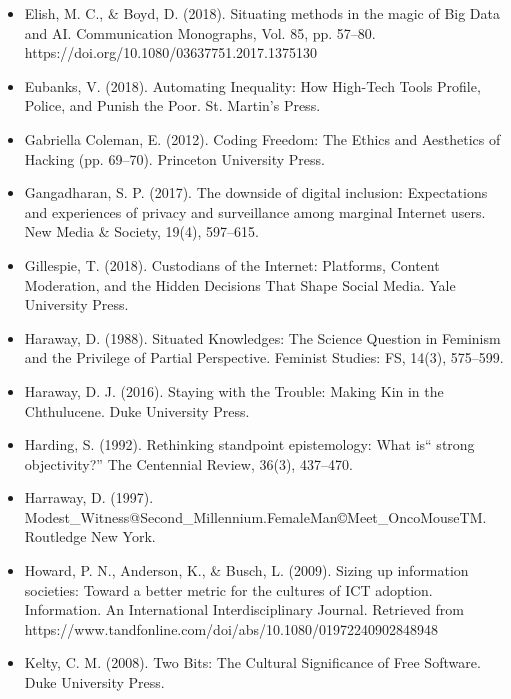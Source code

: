 \documentclass[a4paper,man,natbib]{apa6}
\begin{document}
\begin{itemize}[label={},itemindent=-2em,leftmargin=2em]
   \item Elish, M. C., \& Boyd, D. (2018). Situating methods in the magic of Big Data and AI. Communication Monographs, Vol. 85, pp. 57–80. https://doi.org/10.1080/03637751.2017.1375130

   \item Eubanks, V. (2018). Automating Inequality: How High-Tech Tools Profile, Police, and Punish the Poor. St. Martin’s Press.

   \item Gabriella Coleman, E. (2012). Coding Freedom: The Ethics and Aesthetics of Hacking (pp. 69–70). Princeton University Press.

   \item Gangadharan, S. P. (2017). The downside of digital inclusion: Expectations and experiences of privacy and surveillance among marginal Internet users. New Media \& Society, 19(4), 597–615.

   \item Gillespie, T. (2018). Custodians of the Internet: Platforms, Content Moderation, and the Hidden Decisions That Shape Social Media. Yale University Press.

   \item Haraway, D. (1988). Situated Knowledges: The Science Question in Feminism and the Privilege of Partial Perspective. Feminist Studies: FS, 14(3), 575–599.

   \item Haraway, D. J. (2016). Staying with the Trouble: Making Kin in the Chthulucene. Duke University Press.

   \item Harding, S. (1992). Rethinking standpoint epistemology: What is“ strong objectivity?” The Centennial Review, 36(3), 437–470.

   \item Harraway, D. (1997). Modest\_Witness@Second\_Millennium.FemaleMan©Meet\_OncoMouseTM. Routledge New York.

   \item Howard, P. N., Anderson, K., \& Busch, L. (2009). Sizing up information societies: Toward a better metric for the cultures of ICT adoption. Information. An International Interdisciplinary Journal. Retrieved from https://www.tandfonline.com/doi/abs/10.1080/01972240902848948

   \item Kelty, C. M. (2008). Two Bits: The Cultural Significance of Free Software. Duke University Press.


\end{itemize}
\end{document}
